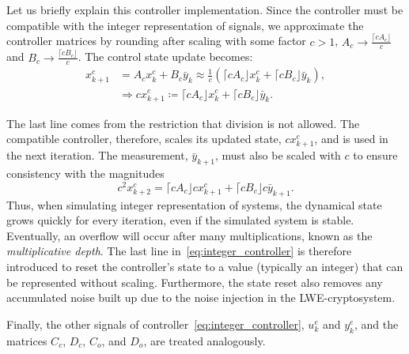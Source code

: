\documentclass[journal, twoside, web]{ieeecolorpreprint}
\begin{document}
Let us briefly explain this controller implementation. Since the controller must be compatible with the integer representation of signals, we approximate the controller matrices by rounding after scaling with some factor $c>1$, $A_c \rightarrow \frac{\lceil cA_c \rfloor}{c}$ and $B_c \rightarrow \frac{\lceil cB_c \rfloor}{c}$. The control state update becomes:
\begin{align*}
    x_{k+1}^c & = A_cx^c_k + B_c \bar y_{k} \approx \frac{1}{c}\left ( \lceil c A_c \rfloor x^c_k + \lceil cB_c \rfloor \bar y_{k} \right ), \\
     & \Rightarrow cx_{k+1}^c \coloneqq \lceil c A_c \rfloor x^c_{k} + \lceil cB_c \rfloor \bar y_{k}.
\end{align*}

The last line comes from the restriction that division is not allowed. The compatible controller, therefore, scales its updated state, $cx_{k+1}^c$, and is used in the next iteration. The measurement, $\bar y_{k+1}$, must also be scaled with $c$ to ensure consistency with the magnitudes
\begin{equation*}
    c^2x_{k+2}^c= \lceil c A_c \rfloor c x^c_{k+1} + \lceil cB_c \rfloor c \bar y_{k+1}.
\end{equation*}
Thus, when simulating integer representation of systems, the dynamical state grows quickly for every iteration, even if the simulated system is stable. Eventually, an overflow will occur after many multiplications, known as the \emph{multiplicative depth}. The last line in~\eqref{eq:integer_controller} is therefore introduced to reset the controller's state to a value (typically an integer) that can be represented without scaling. Furthermore, the state reset also removes any accumulated noise built up due to the noise injection in the LWE-cryptosystem.

Finally, the other signals of controller~\eqref{eq:integer_controller}, $u^e_k$ and $y^e_k$, and the matrices $C_c$, $D_c$, $ C_o$, and $ D_o$, are treated analogously.


\end{document}

